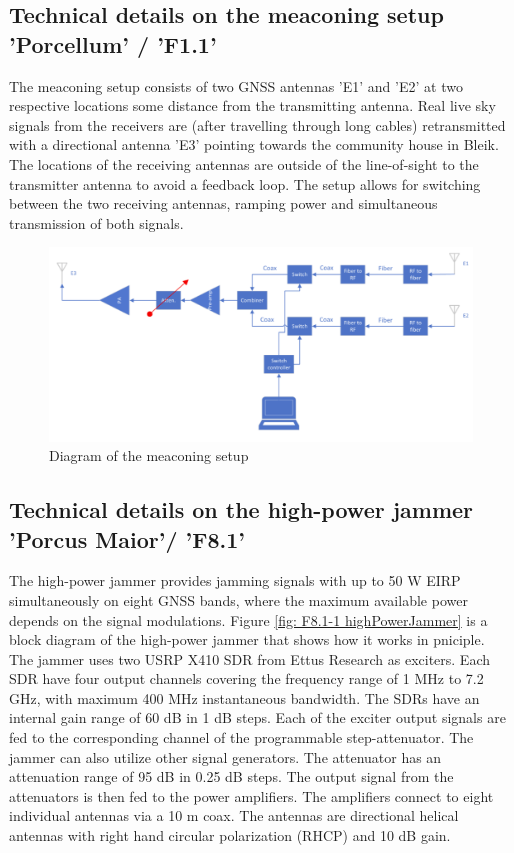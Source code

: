 




\subsection{Technical details on the meaconing setup 'Porcellum' / 'F1.1'}
The meaconing setup consists of two GNSS antennas 'E1' and 'E2' at two respective locations some
distance from the transmitting antenna. Real live sky signals from the receivers are (after travelling
through long cables) retransmitted with a directional antenna 'E3' pointing towards the community
house in Bleik. The locations of the receiving antennas are outside of the line-of-sight to the
transmitter antenna to avoid a feedback loop. The setup allows for switching between the two
receiving antennas, ramping power and simultaneous transmission of both signals.
\begin{figure}[H]
    \includegraphics[width=\textwidth]{graphics/appendixG/meaconingSetup.png}
    \caption{Diagram of the meaconing setup}
\end{figure}

\subsection{Technical details on the high-power jammer 'Porcus Maior'/ 'F8.1'}
The high-power jammer provides jamming signals with up to 50 W EIRP simultaneously on eight GNSS
bands, where the maximum available power depends on the signal modulations. Figure \ref{fig: F8.1-1 highPowerJammer} is a
block diagram of the high-power jammer that shows how it works in pniciple. The jammer uses two
USRP X410 SDR from Ettus Research as exciters. Each SDR have four output channels covering the
frequency range of 1 MHz to 7.2 GHz, with maximum 400 MHz instantaneous bandwidth. The SDRs
have an internal gain range of 60 dB in 1 dB steps. Each of the exciter output signals are fed to the
corresponding channel of the programmable step-attenuator. The jammer can also utilize other signal
generators. The attenuator has an attenuation range of 95 dB in 0.25 dB steps. The output signal from
the attenuators is then fed to the power amplifiers. The amplifiers connect to eight individual
antennas via a 10 m coax. The antennas are directional helical antennas with right hand circular
polarization (RHCP) and 10 dB gain.

